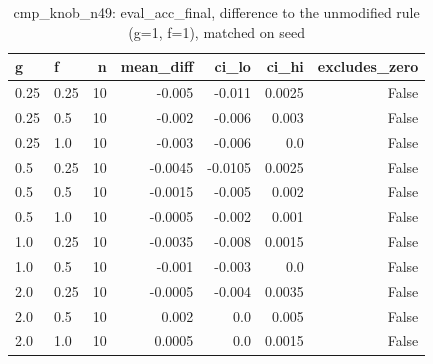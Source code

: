 \begin{table}[t]
\centering
\small
\begin{tabular}{llrrrrr}
\toprule
g & f & n & mean\_diff & ci\_lo & ci\_hi & excludes\_zero \\
\midrule
0.25 & 0.25 & 10 & -0.005 & -0.011 & 0.0025 & False \\
0.25 & 0.5 & 10 & -0.002 & -0.006 & 0.003 & False \\
0.25 & 1.0 & 10 & -0.003 & -0.006 & 0.0 & False \\
0.5 & 0.25 & 10 & -0.0045 & -0.0105 & 0.0025 & False \\
0.5 & 0.5 & 10 & -0.0015 & -0.005 & 0.002 & False \\
0.5 & 1.0 & 10 & -0.0005 & -0.002 & 0.001 & False \\
1.0 & 0.25 & 10 & -0.0035 & -0.008 & 0.0015 & False \\
1.0 & 0.5 & 10 & -0.001 & -0.003 & 0.0 & False \\
2.0 & 0.25 & 10 & -0.0005 & -0.004 & 0.0035 & False \\
2.0 & 0.5 & 10 & 0.002 & 0.0 & 0.005 & False \\
2.0 & 1.0 & 10 & 0.0005 & 0.0 & 0.0015 & False \\
\bottomrule
\end{tabular}
\caption{cmp\_knob\_n49: eval\_acc\_final, difference to the unmodified rule (g=1, f=1), matched on seed}
\label{tab:plasticity_cmp_knob_n49_eval_acc_final_paired}
\end{table}